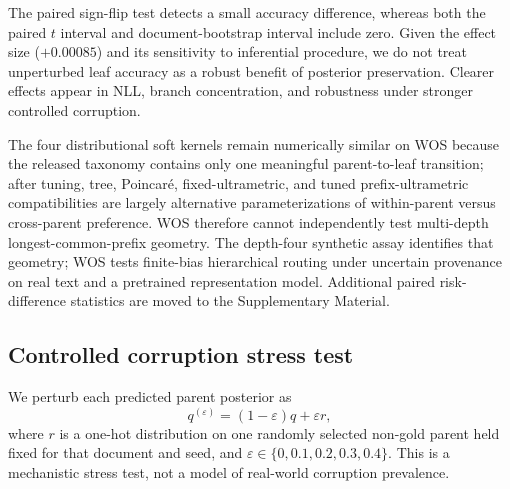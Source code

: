 \documentclass[preprint,11pt]{elsarticle}
\begin{document}
\begin{table}[H]
\centering
\caption{Paired document-bootstrap sensitivity analysis for key WOS contrasts. Differences are first method minus second method; percentile 95\% CIs use 20,000 resamples of 7,048 fixed test documents.}
\label{tab:boot}
\scriptsize
\setlength{\tabcolsep}{3.5pt}
\end{table}

The paired sign-flip test detects a small accuracy difference, whereas both the paired $t$ interval and document-bootstrap interval include zero. Given the effect size ($+0.00085$) and its sensitivity to inferential procedure, we do not treat unperturbed leaf accuracy as a robust benefit of posterior preservation. Clearer effects appear in NLL, branch concentration, and robustness under stronger controlled corruption.

The four distributional soft kernels remain numerically similar on WOS because the released taxonomy contains only one meaningful parent-to-leaf transition; after tuning, tree, Poincar\'e, fixed-ultrametric, and tuned prefix-ultrametric compatibilities are largely alternative parameterizations of within-parent versus cross-parent preference. WOS therefore cannot independently test multi-depth longest-common-prefix geometry. The depth-four synthetic assay identifies that geometry; WOS tests finite-bias hierarchical routing under uncertain provenance on real text and a pretrained representation model. Additional paired risk-difference statistics are moved to the Supplementary Material.

\subsection{Controlled corruption stress test}
We perturb each predicted parent posterior as
\begin{equation}
 q^{(\varepsilon)}=(1-\varepsilon)q+\varepsilon r,
\end{equation}
where $r$ is a one-hot distribution on one randomly selected non-gold parent held fixed for that document and seed, and $\varepsilon\in\{0,0.1,0.2,0.3,0.4\}$. This is a mechanistic stress test, not a model of real-world corruption prevalence.
\end{document}

